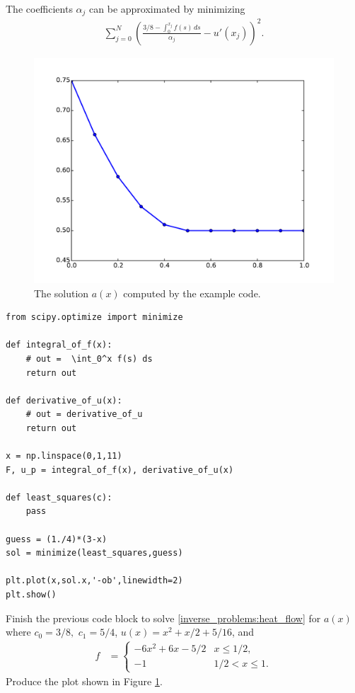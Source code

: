 The coefficients $\alpha_j$ can be approximated by minimizing 
\begin{align*}
	\sum_{j=0}^N \left( \frac{3/8 - \int_0^{x_j} f(s)\, ds}{\alpha_j} - u'(x_j)  \right)^2.
\end{align*}

\begin{figure}
\centering
\includegraphics[width=\textwidth]{density_a.pdf}
\caption{The solution $a(x)$ computed by the example code.}
\label{fig:inverse_problems:exercise1}
\end{figure}

\begin{lstlisting}
from scipy.optimize import minimize

def integral_of_f(x):
	# out =  \int_0^x f(s) ds
	return out

def derivative_of_u(x):
	# out = derivative_of_u
	return out

x = np.linspace(0,1,11)
F, u_p = integral_of_f(x), derivative_of_u(x)

def least_squares(c):
	pass

guess = (1./4)*(3-x)
sol = minimize(least_squares,guess)

plt.plot(x,sol.x,'-ob',linewidth=2)
plt.show()
\end{lstlisting}

\begin{problem}
	Finish the previous code block to solve \eqref{inverse_problems:heat_flow} for $a(x)$ where $c_0 = 3/8,$ $c_1 = 5/4$, $u(x) = x^2 + x/2 + 5/16$, and 
	\begin{align*}
		f &= \begin{cases}
			-6x^2 + 6x - 5/2 & x \leq 1/2,\\
			-1 & 1/2 < x \leq 1.
		\end{cases}
	\end{align*}
	Produce the plot shown in Figure \ref{fig:inverse_problems:exercise1}.
\end{problem}

